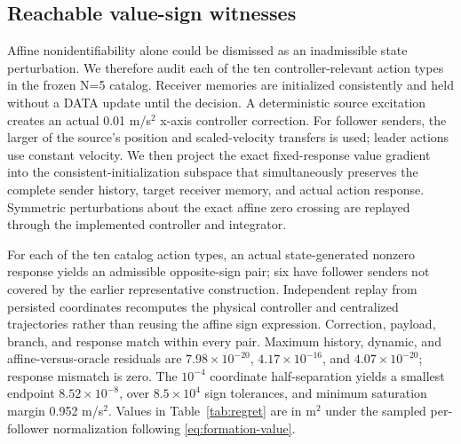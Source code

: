 \documentclass[10pt,twocolumn,twoside]{IEEEtran}
\begin{document}
\subsection{Reachable value-sign witnesses}

Affine nonidentifiability alone could be dismissed as an inadmissible state
perturbation.  We therefore audit each of the ten controller-relevant action
types in the frozen N=5 catalog.  Receiver memories are initialized
consistently and held without a DATA update until the decision.  A deterministic source excitation
creates an actual 0.01 m/s$^2$ x-axis controller correction.  For follower
senders, the larger of the source's position and scaled-velocity transfers is
used; leader actions use constant velocity.  We then project the exact
fixed-response value gradient into the consistent-initialization subspace that
simultaneously preserves the complete sender history, target receiver memory,
and actual action response.  Symmetric perturbations about the exact affine
zero crossing are replayed through the implemented controller and integrator.

For each of the ten catalog action types, an actual state-generated nonzero
response yields an admissible opposite-sign pair; six have follower senders
not covered by the earlier representative construction.
Independent replay from persisted coordinates recomputes the physical
controller and centralized trajectories rather than reusing the affine sign
expression.  Correction, payload, branch, and response match within every
pair.  Maximum history, dynamic, and affine-versus-oracle residuals are
\(7.98\times10^{-20}\), \(4.17\times10^{-16}\), and
\(4.07\times10^{-20}\); response mismatch is zero.  The \(10^{-4}\)
coordinate half-separation yields a smallest endpoint \(8.52\times10^{-8}\),
over \(8.5\times10^4\) sign tolerances, and minimum saturation margin 0.952
m/s$^2$.  Values in
Table~\ref{tab:regret} are in \(\mathrm{m}^2\) under the sampled per-follower
normalization following \eqref{eq:formation-value}.
\end{document}
